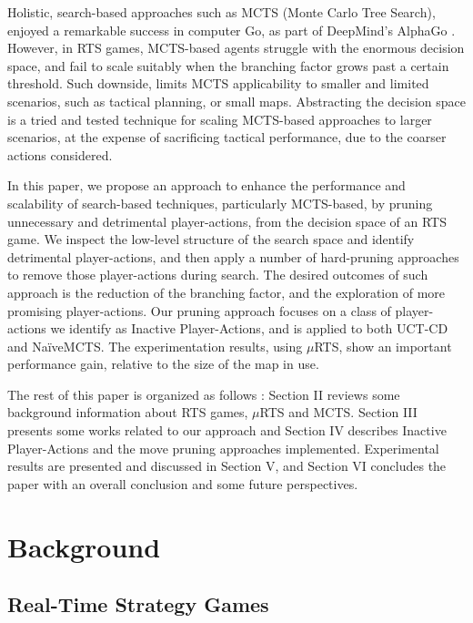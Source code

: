 \documentclass[conference]{IEEEtran}
\newcommand{\mRTS}{$\mu$RTS}
\begin{document}
Holistic, search-based approaches such as MCTS (Monte Carlo Tree Search), enjoyed a remarkable success in computer Go, as part of DeepMind's AlphaGo \cite{silver_mastering_2016}. However, in RTS games, MCTS-based agents struggle with the enormous decision space, and fail to scale suitably when the branching factor grows past a certain threshold. Such downside, limits MCTS applicability to smaller and limited scenarios, such as tactical planning, or small maps. Abstracting the decision space is a tried and tested technique for scaling MCTS-based approaches to larger scenarios, at the expense of sacrificing tactical performance, due to the coarser actions considered.

In this paper, we propose an approach to enhance the performance and scalability of search-based techniques, particularly MCTS-based, by pruning unnecessary and detrimental player-actions, from the decision space of an RTS game. We inspect the low-level structure of the search space and identify detrimental player-actions, and then apply a number of hard-pruning approaches to remove those player-actions during search. The desired outcomes of such approach is the reduction of the branching factor, and the exploration of more promising player-actions. Our pruning approach focuses on a class of player-actions we identify as Inactive Player-Actions, and is applied to both UCT-CD and NaïveMCTS. The experimentation results, using \mRTS{}, show an important performance gain, relative to the size of the map in use.

The rest of this paper is organized as follows : Section II reviews some background information about RTS games, \mRTS{} and MCTS. Section III presents some works related to our approach and Section IV describes Inactive Player-Actions and the move pruning approaches implemented. Experimental results are presented and discussed in Section V, and Section VI concludes the paper with an overall conclusion and some future perspectives.

\section{Background}

\subsection{Real-Time Strategy Games}
\end{document}
